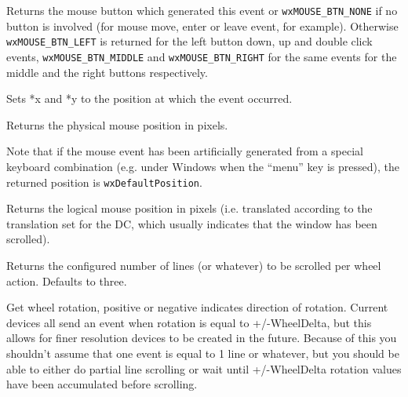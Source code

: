\label{wxmouseeventgetbutton}


Returns the mouse button which generated this event or {\tt wxMOUSE\_BTN\_NONE} 
if no button is involved (for mouse move, enter or leave event, for example).
Otherwise {\tt wxMOUSE\_BTN\_LEFT} is returned for the left button down, up and
double click events, {\tt wxMOUSE\_BTN\_MIDDLE} and {\tt wxMOUSE\_BTN\_RIGHT} 
for the same events for the middle and the right buttons respectively.


\label{wxmouseeventgetposition}




Sets *x and *y to the position at which the event occurred.

Returns the physical mouse position in pixels.

Note that if the mouse event has been artificially generated from a special
keyboard combination (e.g. under Windows when the ``menu'' key is pressed), the
returned position is \texttt{wxDefaultPosition}.


\label{wxmouseeventgetlogicalposition}


Returns the logical mouse position in pixels (i.e. translated according to the
translation set for the DC, which usually indicates that the window has been scrolled).



\label{wxmouseeventgetlinesperaction}


Returns the configured number of lines (or whatever) to be scrolled per
wheel action.  Defaults to three.


\label{wxmouseeventgetwheelrotation}


Get wheel rotation, positive or negative indicates direction of
rotation.  Current devices all send an event when rotation is equal to
+/-WheelDelta, but this allows for finer resolution devices to be
created in the future.  Because of this you shouldn't assume that one
event is equal to 1 line or whatever, but you should be able to either
do partial line scrolling or wait until +/-WheelDelta rotation values
have been accumulated before scrolling.


